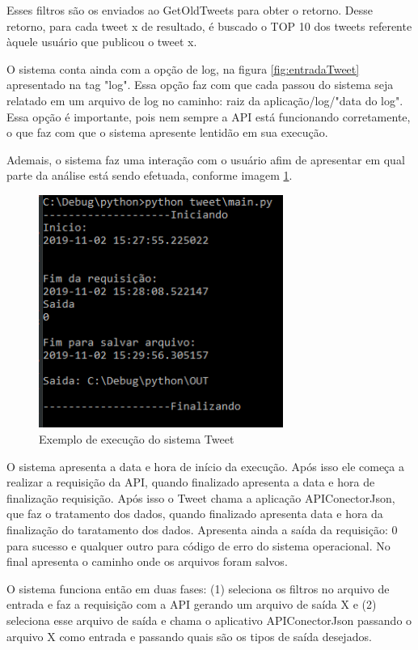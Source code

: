 Esses filtros são os enviados ao GetOldTweets\cite{Pythoncommunity} para obter o retorno. Desse retorno, para cada tweet x de resultado, é buscado o TOP 10 dos tweets referente àquele usuário que publicou o tweet x.

O sistema conta ainda com a opção de log, na figura \ref{fig:entradaTweet} apresentado na tag "log". Essa opção faz com que cada passou do sistema seja relatado em um arquivo de log no caminho: raiz da aplicação/log/"data do log". Essa opção é importante, pois nem sempre a API está funcionando corretamente, o que faz com que o sistema apresente lentidão em sua execução. 

Ademais, o sistema faz uma interação com o usuário afim de apresentar em qual parte da análise está sendo efetuada, conforme imagem \ref{fig:TweetExecucao}.

\begin{figure}[H]
\centering
\includegraphics[width=8cm]{imagens/TweetExecucao.png}
\caption{Exemplo de execução do sistema Tweet}
\label{fig:TweetExecucao}
\end{figure}

O sistema apresenta a data e hora de início da execução. Após isso ele começa a realizar a requisição da API, quando finalizado apresenta a data e hora de finalização requisição. Após isso o Tweet chama a aplicação APIConectorJson, que faz o tratamento dos dados, quando finalizado apresenta data e hora da finalização do taratamento dos dados. Apresenta ainda a saída da requisição: 0 para sucesso e qualquer outro para código de erro do sistema operacional. No final apresenta o caminho onde os arquivos foram salvos.

O sistema funciona então em duas fases: (1) seleciona os filtros no arquivo de entrada e faz a requisição com a API gerando um arquivo de saída X e (2) seleciona esse arquivo de saída e chama o aplicativo APIConectorJson passando o arquivo X como entrada e passando quais são os tipos de saída desejados. 

